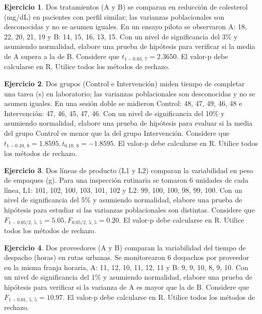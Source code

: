 \documentclass[
  11pt,
]{book}
\theoremstyle{definition}
\theoremstyle{definition}
\theoremstyle{definition}
\newtheorem{exercise}{Ejercicio}[chapter]
\theoremstyle{definition}
\theoremstyle{remark}
\begin{document}
\begin{exercise}
Dos tratamientos (A y B) se comparan en reducción de colesterol (mg/dL) en pacientes con perfil similar; las varianzas poblacionales son desconocidas y no se asumen iguales. En un ensayo piloto se observaron A: 18, 22, 20, 21, 19 y B: 14, 15, 16, 13, 15. Con un nivel de significancia del 3\% y asumiendo normalidad, elabore una prueba de hipótesis para verificar si la media de A supera a la de B. Considere que \(t_{1-0.03,\,7}=2.3650\). El valor-p debe calcularse en R. Utilice todos los métodos de rechazo.
\end{exercise}

\begin{exercise}
Dos grupos (Control e Intervención) miden tiempo de completar una tarea (s) en laboratorio; las varianzas poblacionales son desconocidas y no se asumen iguales. En una sesión doble se midieron Control: 48, 47, 49, 46, 48 e Intervención: 47, 46, 45, 47, 46. Con un nivel de significancia del 10\% y asumiendo normalidad, elabore una prueba de hipótesis para evaluar si la media del grupo Control es menor que la del grupo Intervención. Considere que \(t_{1-0.10,\,8}=1.8595, t_{0.10,\,8}=-1.8595\). El valor-p debe calcularse en R. Utilice todos los métodos de rechazo.
\end{exercise}

\begin{exercise}
Dos líneas de producto (L1 y L2) comparan la variabilidad en peso de empaques (g). Para una inspección rutinaria se tomaron 6 unidades de cada línea, L1: 101, 102, 100, 103, 101, 102 y L2: 99, 100, 100, 98, 99, 100. Con un nivel de significancia del 5\% y asumiendo normalidad, elabore una prueba de hipótesis para estudiar si las varianzas poblacionales son distintas. Considere que \(F_{1-0.05/2,\,5,\,5}=5.05, F_{0.05/2,\,5,\,5}=0.20\). El valor-p debe calcularse en R. Utilice todos los métodos de rechazo.
\end{exercise}

\begin{exercise}
Dos proveedores (A y B) comparan la variabilidad del tiempo de despacho (horas) en rutas urbanas. Se monitorearon 6 despachos por proveedor en la misma franja horaria, A: 11, 12, 10, 11, 12, 11 y B: 9, 9, 10, 8, 9, 10. Con un nivel de significancia del 1\% y asumiendo normalidad, elabore una prueba de hipótesis para verificar si la varianza de A es mayor que la de B. Considere que \(F_{1-0.01,\,5,\,5}=10.97\). El valor-p debe calcularse en R. Utilice todos los métodos de rechazo.
\end{exercise}
\end{document}
